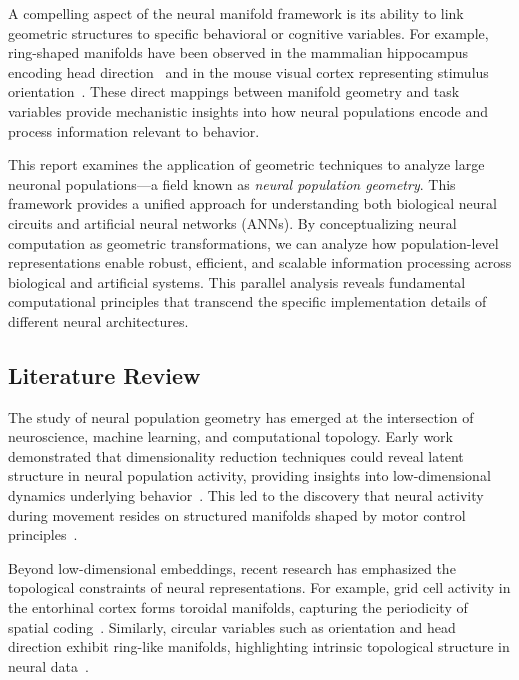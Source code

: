 \documentclass[11pt,a4paper]{article}
\begin{document}
A compelling aspect of the neural manifold framework is its ability to link geometric structures to specific behavioral or cognitive variables. For example, ring-shaped manifolds have been observed in the mammalian hippocampus encoding head direction~\cite{chaudhuri2019intrinsic} and in the mouse visual cortex representing stimulus orientation~\cite{beshkov2024topological}. These direct mappings between manifold geometry and task variables provide mechanistic insights into how neural populations encode and process information relevant to behavior.

This report examines the application of geometric techniques to analyze large neuronal populations—a field known as \textit{neural population geometry}. This framework provides a unified approach for understanding both biological neural circuits and artificial neural networks (ANNs). By conceptualizing neural computation as geometric transformations, we can analyze how population-level representations enable robust, efficient, and scalable information processing across biological and artificial systems. This parallel analysis reveals fundamental computational principles that transcend the specific implementation details of different neural architectures.

\subsection{Literature Review}

The study of neural population geometry has emerged at the intersection of neuroscience, machine learning, and computational topology. Early work demonstrated that dimensionality reduction techniques could reveal latent structure in neural population activity, providing insights into low-dimensional dynamics underlying behavior~\cite{cunningham2014dimensionality}. This led to the discovery that neural activity during movement resides on structured manifolds shaped by motor control principles~\cite{gallego2017neural}.

Beyond low-dimensional embeddings, recent research has emphasized the topological constraints of neural representations. For example, grid cell activity in the entorhinal cortex forms toroidal manifolds, capturing the periodicity of spatial coding~\cite{gardner2022toroidal}. Similarly, circular variables such as orientation and head direction exhibit ring-like manifolds, highlighting intrinsic topological structure in neural data~\cite{chaudhuri2019intrinsic}.
\end{document}
